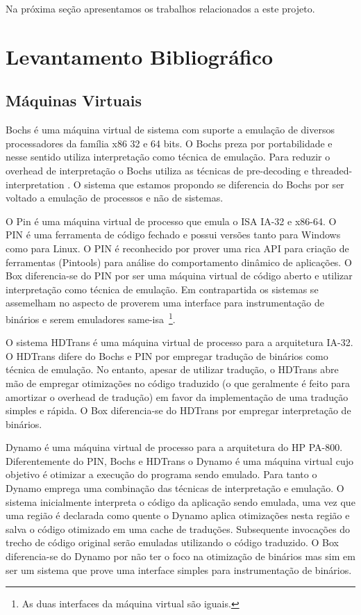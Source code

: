 \documentclass[11pt,twoside]{article}
\begin{document}
Na próxima seção apresentamos os trabalhos relacionados a este projeto.


\section{Levantamento Bibliográfico}

\subsection{Máquinas Virtuais}
Bochs \cite{bochs} é uma máquina virtual de sistema com suporte a emulação
de diversos processadores da família x86 32 e 64 bits. O Bochs preza
por portabilidade e nesse sentido utiliza interpretação como técnica
de emulação. Para reduzir o overhead de interpretação o Bochs utiliza
as técnicas de pre-decoding \cite{smith} e threaded-interpretation \cite{smith}.
O sistema que estamos propondo se diferencia do Bochs por ser voltado
a emulação de processos e não de sistemas.

O Pin \cite{pin} é uma máquina virtual de processo que emula o ISA IA-32
e x86-64. O PIN é uma ferramenta de código fechado e possui versões tanto
para Windows como para Linux. O PIN é reconhecido por prover uma rica
API para criação de ferramentas (Pintools) para análise do comportamento 
dinâmico de aplicações. O Box diferencia-se do PIN por ser uma máquina
virtual de código aberto e utilizar interpretação como técnica de emulação.
Em contrapartida os sistemas se assemelham no aspecto de proverem uma
interface para instrumentação de binários e serem emuladores same-isa~\footnote{As duas interfaces da máquina virtual são iguais.}.

O sistema HDTrans \cite{hdtrans} é uma máquina virtual de processo para
a arquitetura IA-32. O HDTrans difere do Bochs e PIN por empregar tradução
de binários como técnica de emulação. No entanto, apesar de utilizar 
tradução, o HDTrans abre mão de empregar otimizações no código traduzido
(o que geralmente é feito para amortizar o overhead de tradução) em favor 
da implementação de uma tradução simples e rápida. O Box diferencia-se do
HDTrans por empregar interpretação de binários.

Dynamo \cite{dynamo} é uma máquina virtual de processo para a arquitetura
do HP PA-800. Diferentemente do PIN, Bochs e HDTrans o Dynamo é uma máquina
virtual cujo objetivo é otimizar a execução do programa sendo emulado.
Para tanto o Dynamo emprega uma combinação das técnicas de interpretação
e emulação. O sistema inicialmente interpreta o código da aplicação sendo 
emulada, uma vez que uma região é declarada como quente o Dynamo aplica 
otimizações nesta região e salva o código otimizado em uma cache de traduções. 
Subsequente invocações do trecho de código original serão emuladas utilizando 
o código traduzido. O Box diferencia-se do Dynamo por não ter o foco na otimização 
de binários mas sim em ser um sistema que prove uma interface simples para 
instrumentação de binários.
\end{document}

